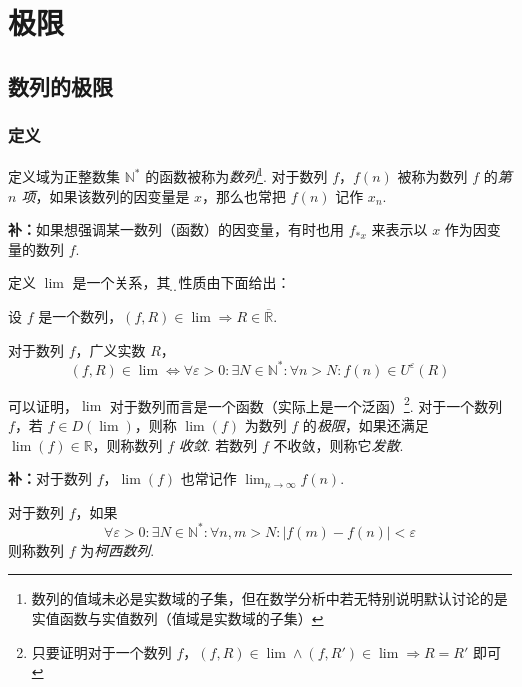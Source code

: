 \section{极限}
\subsection{数列的极限}
\subsubsection{定义}
\begin{definition}
    定义域为正整数集 $\mathbb{N}^*$ 的函数被称为\emph{数列}\footnote{数列的值域未必是实数域的子集，但在数学分析中若无特别说明默认讨论的是实值函数与实值数列（值域是实数域的子集）}. 对于数列 $f$，$f(n)$ 被称为数列 $f$ 的\emph{第 $n$ 项}，如果该数列的因变量是 $x$，那么也常把 $f(n)$ 记作 $x_n$.

    \textbf{补：}如果想强调某一数列（函数）的因变量，有时也用 $f_{*x}$ 来表示以 $x$ 作为因变量的数列 $f$.
\end{definition}\vspace{9pt}

\begin{definition}
    定义 $\lim$ 是一个关系，其\d{部}\d{分}性质由下面给出：

    设 $f$ 是一个数列，$(f,R) \in \lim \Rightarrow R \in \overline{\mathbb{R}}$.

    对于数列 $f$，广义实数 $R$，
    \[(f,R) \in \lim \Leftrightarrow \forall \varepsilon > 0: \exists N \in \mathbb{N}^*: \forall n > N: f(n) \in U^\varepsilon(R)\]

    可以证明，$\lim$ 对于数列而言是一个函数（实际上是一个泛函）\footnote{只要证明对于一个数列 $f$，$(f,R) \in \lim \wedge (f,R') \in \lim \Rightarrow R = R'$ 即可}. 对于一个数列 $f$，若 $f \in D(\lim)$，则称 $\lim(f)$ 为数列 $f$ 的\emph{极限}，如果还满足 $\lim(f) \in \mathbb{R}$，则称数列 $f$ \emph{收敛}. 若数列 $f$ 不收敛，则称它\emph{发散}.

    \textbf{补：}对于数列 $f$，$\lim(f)$ 也常记作 $\displaystyle \lim_{n \rightarrow \infty} f(n)$.
\end{definition}\vspace{9pt}

\begin{definition}
    对于数列 $f$，如果
    \[\forall \varepsilon > 0: \exists N \in \mathbb{N}^*: \forall n,m > N: \bigl\vert f(m) - f(n)\bigr\vert < \varepsilon\]
    则称数列 $f$ 为\emph{柯西数列}.
\end{definition}\vspace{9pt}

